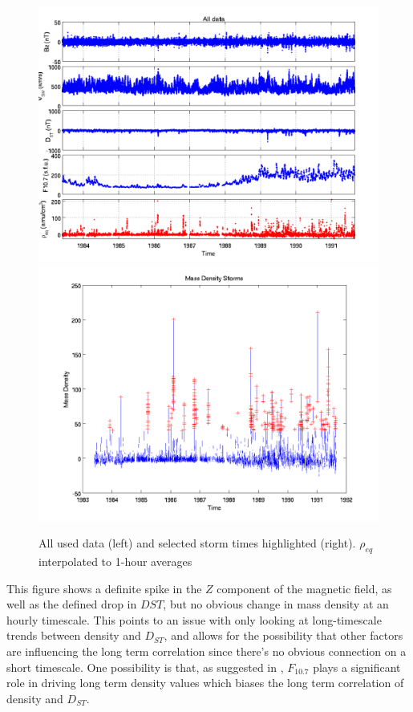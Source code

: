 \documentclass[10pt,twocolumn]{article}
\begin{document}
\begin{figure}[htp]
\centering
\includegraphics[scale=0.35]{paperfigures/alldata.png}
\includegraphics[scale=0.35]{paperfigures/massdensitystorms.png}
\caption{All used data (left) and selected storm times highlighted (right). $\rho_{eq}$ interpolated to 1-hour averages}
\label{DSTstorm}
\end{figure}

This figure shows a definite spike in the $Z$ component of the magnetic field, as well as the defined drop in $DST$, but no obvious change in mass density at an hourly timescale. This points to an issue with only looking at long-timescale trends between density and $D_{ST}$, and allows for the possibility that other factors are influencing the long term correlation since there's no obvious connection on a short timescale. One possibility is that, as suggested in \cite{Takahashi2010}, $F_{10.7}$ plays a significant role in driving long term density values which biases the long term correlation of density and $D_{ST}$.
\end{document}
